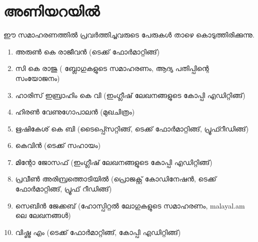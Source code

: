 \section*{അണിയറയില്‍}

ഈ സമാഹരണത്തില്‍ പ്രവര്‍ത്തിച്ചവരുടെ പേരുകള്‍ താഴെ കൊടുത്തിരിക്കുന്നു. 

\begin{enumerate}
 \item അരുണ്‍ കെ രാജീവന്‍ (ടെക്ക് ഫോര്‍മാറ്റിങ്ങ്)
 \item സി കെ രാജു ( ബ്ലോഗുകളുടെ സമാഹരണം, ആദ്യ പതിപ്പിന്റെ സംയോജനം)
 \item ഹാരിസ് ഇബ്രാഹിം  കെ വി  (ഇംഗ്ലീഷ് ലേഖനങ്ങളുടെ കോപ്പി എഡിറ്റിങ്ങ്)
 \item ഹിരണ്‍ വേണുഗോപാലന്‍ (മുഖചിത്രം)
 \item ഋഷികേശ് കെ ബി (ടൈപ്പ്സെറ്റിങ്ങ്, ടെക്ക് ഫോര്‍മാറ്റിങ്ങ്, പ്രൂഫ്റീഡിങ്ങ്) 
 \item കെവിന്‍ (ടെക്ക് സഹായം)
 \item മിന്റോ ജോസഫ് (ഇംഗ്ലീഷ് ലേഖനങ്ങളുടെ കോപ്പി എഡിറ്റിങ്ങ്)
 \item പ്ര‌‌വീണ്‍ അരിമ്പ്രത്തൊടിയില്‍ (പ്രൊജക്റ്റ് കോഡിനേഷന്‍, ടെക്ക് ഫോര്‍മാറ്റിങ്ങ്, പ്രൂഫ് റീഡിങ്ങ്)
 \item സെബിന്‍ ജേക്കബ് (ഹോസ്പിറ്റല്‍ ലോഗുകളുടെ സമാഹരണം, malayal.am ലെ ലേഖനങ്ങള്‍)
 \item വിഷ്ണു എം (ടെക്ക് ഫോര്‍മാറ്റിങ്ങ്, കോപ്പി എഡിറ്റിങ്ങ്)
\end{enumerate}

\newpage

